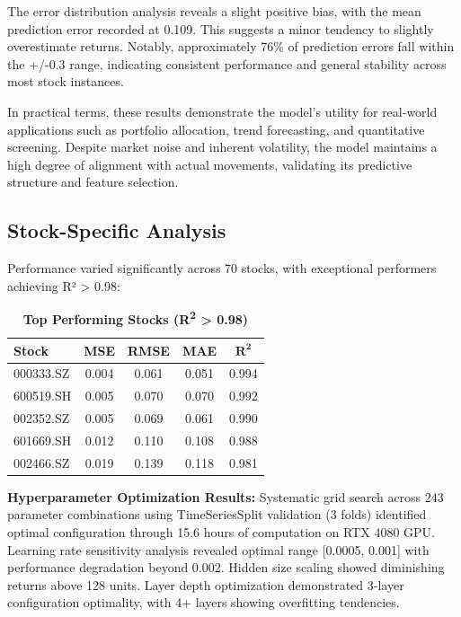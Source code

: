 \documentclass[3p,times,procedia]{elsarticle}
\begin{document}
The error distribution analysis reveals a slight positive bias, with the mean prediction error recorded at 0.109. This suggests a minor tendency to slightly overestimate returns. Notably, approximately 76\% of prediction errors fall within the +/-0.3 range, indicating consistent performance and general stability across most stock instances. 

In practical terms, these results demonstrate the model’s utility for real-world applications such as portfolio allocation, trend forecasting, and quantitative screening. Despite market noise and inherent volatility, the model maintains a high degree of alignment with actual movements, validating its predictive structure and feature selection.


\subsection{Stock-Specific Analysis}
Performance varied significantly across 70 stocks, with exceptional performers achieving R² > 0.98:

\begin{table}[!ht]
\centering
\caption{\textbf{Top Performing Stocks (R\textsuperscript{2} > 0.98)}}
\renewcommand{\arraystretch}{1.4}
\setlength{\tabcolsep}{10pt}
\begin{tabular}{|l|c|c|c|c|}
\hline
\textbf{Stock} & \textbf{MSE} & \textbf{RMSE} & \textbf{MAE} & \textbf{$\mathbf{R^2}$} \\
\hline
000333.SZ  & 0.004 & 0.061 & 0.051 & 0.994 \\
600519.SH  & 0.005 & 0.070 & 0.070 & 0.992 \\
002352.SZ  & 0.005 & 0.069 & 0.061 & 0.990 \\
601669.SH  & 0.012 & 0.110 & 0.108 & 0.988 \\
002466.SZ  & 0.019 & 0.139 & 0.118 & 0.981 \\
\hline
\end{tabular}
\end{table}

\textbf{Hyperparameter Optimization Results:} Systematic grid search across 243 parameter combinations using TimeSeriesSplit validation (3 folds) identified optimal configuration through 15.6 hours of computation on RTX 4080 GPU. Learning rate sensitivity analysis revealed optimal range [0.0005, 0.001] with performance degradation beyond 0.002. Hidden size scaling showed diminishing returns above 128 units. Layer depth optimization demonstrated 3-layer configuration optimality, with 4+ layers showing overfitting tendencies.
\end{document}
